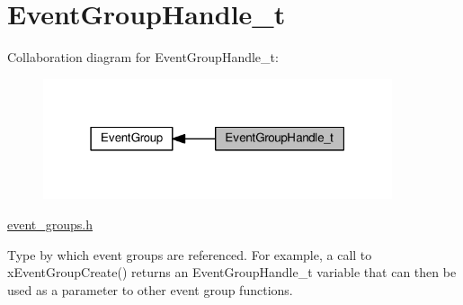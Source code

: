 \hypertarget{group__EventGroupHandle__t}{}\section{Event\+Group\+Handle\+\_\+t}
\label{group__EventGroupHandle__t}
Collaboration diagram for Event\+Group\+Handle\+\_\+t\+:\nopagebreak
\begin{figure}[H]
\begin{center}
\leavevmode
\includegraphics[width=291pt]{dc/d43/group__EventGroupHandle__t}
\end{center}
\end{figure}
\hyperlink{event__groups_8h}{event\+\_\+groups.\+h}

Type by which event groups are referenced. For example, a call to x\+Event\+Group\+Create() returns an Event\+Group\+Handle\+\_\+t variable that can then be used as a parameter to other event group functions. 